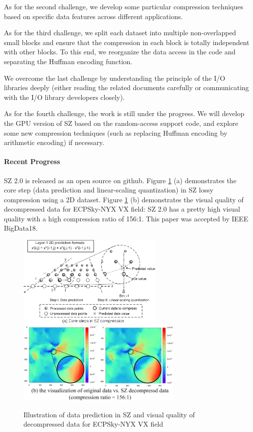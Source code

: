 As for the second challenge, we develop some particular compression techniques based on specific data features across different applications.

As for the third challenge, we split each dataset into multiple non-overlapped small blocks and ensure that the compression in each block is totally independent with other blocks. To this end, we reorganize the data access in the code and separating the Huffman encoding function. 

We overcome the last challenge by understanding the principle of the I/O libraries deeply (either reading the related documents carefully or communicating with the I/O library developers closely).

As for the fourth challenge, the work is still under the progress. We will develop the GPU version of SZ based on the random-access support code, and explore some new compression techniques (such as replacing Huffman encoding by arithmetic encoding) if necessary.  

\paragraph{Recent Progress}

SZ 2.0 is released as an open source on github. Figure \ref{fig:sz-principle} (a) demonstrates the core step (data prediction and linear-scaling quantization) in SZ lossy compression using a 2D dataset. Figure \ref{fig:sz-principle} (b) demonstrates the visual quality of decompressed data for ECPSky-NYX VX field: SZ 2.0 has a pretty high visual quality with a high compression ratio of 156:1. This paper was accepted by IEEE BigData18.

\begin{figure}[htb]
\centering
\includegraphics[width=2.8in]{projects/2.3.4-DataViz/2.3.4.06-EZ/sz-illu.png}
\includegraphics[width=3.2in]{projects/2.3.4-DataViz/2.3.4.06-EZ/Visual-quality-NYX-SZ.png}
\vspace{-2mm}
	\caption{\label{fig:sz-principle}Illustration of data prediction in SZ and visual quality of decompressed data for ECPSky-NYX VX field}
\end{figure}


